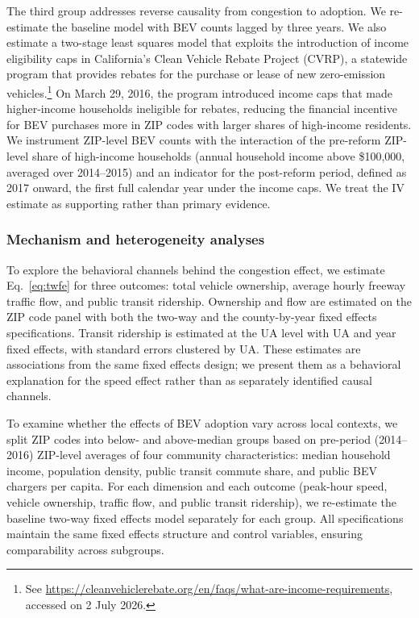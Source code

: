 \documentclass[11pt, letterpaper]{article}
\begin{document}
The third group addresses reverse causality from congestion to adoption.
We re-estimate the baseline model with BEV counts lagged by three years.
We also estimate a two-stage least squares model that exploits the introduction of income eligibility caps in California's Clean Vehicle Rebate Project (CVRP), a statewide program that provides rebates for the purchase or lease of new zero-emission vehicles.\footnote{See \url{https://cleanvehiclerebate.org/en/faqs/what-are-income-requirements}, accessed on 2 July 2026.}
On March 29, 2016, the program introduced income caps that made higher-income households ineligible for rebates, reducing the financial incentive for BEV purchases more in ZIP codes with larger shares of high-income residents.
We instrument ZIP-level BEV counts with the interaction of the pre-reform ZIP-level share of high-income households (annual household income above \$100,000, averaged over 2014--2015) and an indicator for the post-reform period, defined as 2017 onward, the first full calendar year under the income caps.
We treat the IV estimate as supporting rather than primary evidence.

\subsubsection{Mechanism and heterogeneity analyses}
To explore the behavioral channels behind the congestion effect, we estimate Eq.~\eqref{eq:twfe} for three outcomes: total vehicle ownership, average hourly freeway traffic flow, and public transit ridership.
Ownership and flow are estimated on the ZIP code panel with both the two-way and the county-by-year fixed effects specifications.
Transit ridership is estimated at the UA level with UA and year fixed effects, with standard errors clustered by UA.
These estimates are associations from the same fixed effects design; we present them as a behavioral explanation for the speed effect rather than as separately identified causal channels.

To examine whether the effects of BEV adoption vary across local contexts, we split ZIP codes into below- and above-median groups based on pre-period (2014--2016) ZIP-level averages of four community characteristics: median household income, population density, public transit commute share, and public BEV chargers per capita.
For each dimension and each outcome (peak-hour speed, vehicle ownership, traffic flow, and public transit ridership), we re-estimate the baseline two-way fixed effects model separately for each group.
All specifications maintain the same fixed effects structure and control variables, ensuring comparability across subgroups.
\end{document}
